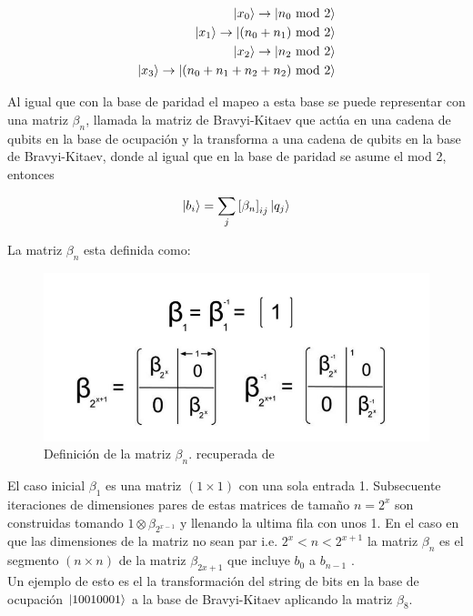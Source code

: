 \documentclass[12pt, oneside]{article}
\begin{document}
\begin{equation}
    \begin{split}
        \ket{x_0}\rightarrow\ket{n_0 \text{ mod 2}}\\
        \ket{x_1}\rightarrow\ket{(n_0+n_1)\text{ mod 2}}\\
        \ket{x_2}\rightarrow\ket{n_2 \text{ mod 2}}\\
        \ket{x_3}\rightarrow\ket{(n_0+n_1+n_2+n_2)\text{ mod 2}}
    \end{split}
\end{equation}

Al igual que con la base de paridad el mapeo a esta base se puede representar con una matriz $\beta_n$, llamada la matriz de Bravyi-Kitaev que actúa en una cadena de qubits en la base de ocupación y la transforma a una cadena de qubits en la base de Bravyi-Kitaev, donde al igual que en la base de paridad se asume el mod 2, entonces

\begin{equation}
    \ket{b_i}=\sum_j\left[\beta_n\right]_{ij}\ket{q_j}
\end{equation}

La matriz $\beta_n$ esta definida como:

\begin{figure}
    \centering
    \includegraphics[width=0.5\linewidth]{imagenes//img-transformacion-de-bravyi/definicion-matrix-beta.png}
    \caption{Definición de la matriz $\beta_n$. recuperada de \cite{Seeley_2012}}
    \label{definicion-matriz-beta}
\end{figure}

El caso inicial $\beta_1$ es una matriz $\left(1\times1\right)$ con una sola entrada 1. Subsecuente iteraciones de dimensiones pares de estas matrices de tamaño $n=2^x$ son construidas tomando $1\otimes\beta_{2^{x-1}}$ y llenando la ultima fila con unos 1. En el caso en que las dimensiones de la matriz no sean par i.e. $2^x<n<2^{x+1}$ la matriz $\beta_n$ es el segmento $(n \times n)$ de la matriz $\beta_{2x+1}$ que incluye $b_0$ a $b_{n-1}$ \cite{Seeley_2012}.\\

Un ejemplo de esto es el la transformación del string de bits en la base de ocupación $\ket{10010001}$ a la base de Bravyi-Kitaev aplicando la matriz $\beta_8$.
\end{document}
